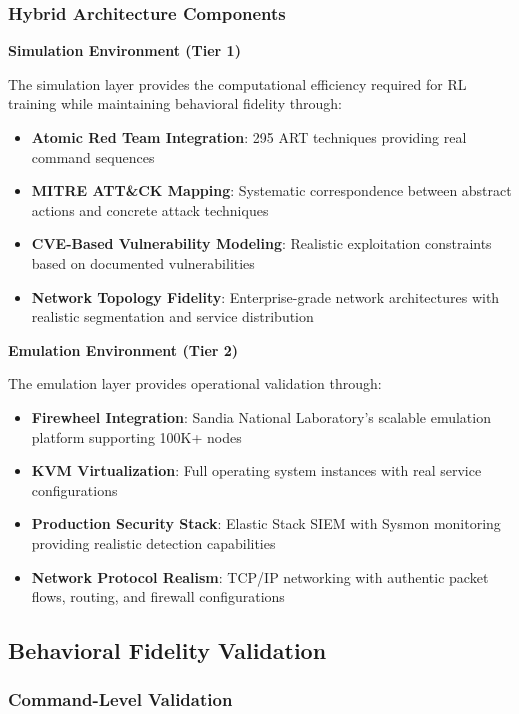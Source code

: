 \subsubsection{Hybrid Architecture Components}

\textbf{Simulation Environment (Tier 1)}

The simulation layer provides the computational efficiency required for RL training while maintaining behavioral fidelity through:

\begin{itemize}
    \item \textbf{Atomic Red Team Integration}: 295 ART techniques providing real command sequences
    \item \textbf{MITRE ATT\&CK Mapping}: Systematic correspondence between abstract actions and concrete attack techniques  
    \item \textbf{CVE-Based Vulnerability Modeling}: Realistic exploitation constraints based on documented vulnerabilities
    \item \textbf{Network Topology Fidelity}: Enterprise-grade network architectures with realistic segmentation and service distribution
\end{itemize}

\textbf{Emulation Environment (Tier 2)}

The emulation layer provides operational validation through:

\begin{itemize}
    \item \textbf{Firewheel Integration}: Sandia National Laboratory's scalable emulation platform supporting 100K+ nodes
    \item \textbf{KVM Virtualization}: Full operating system instances with real service configurations
    \item \textbf{Production Security Stack}: Elastic Stack SIEM with Sysmon monitoring providing realistic detection capabilities
    \item \textbf{Network Protocol Realism}: TCP/IP networking with authentic packet flows, routing, and firewall configurations
\end{itemize}

\subsection{Behavioral Fidelity Validation}

\subsubsection{Command-Level Validation}

